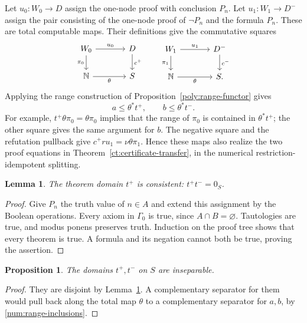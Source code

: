 \documentclass[11pt]{article}
\newtheorem{proposition}[theorem]{Proposition}
\newtheorem{lemma}[theorem]{Lemma}
\theoremstyle{definition}
\theoremstyle{remark}
\newcommand{\N}{\mathbb N}
\begin{document}
Let $u_0:W_0\to D$ assign the one-node proof with conclusion $P_n$.
Let $u_1:W_1\to D^-$ assign the pair consisting of the one-node proof
of $\neg P_n$ and the formula $P_n$. These are total computable maps.
Their definitions give the commutative squares
\begin{equation}\label{num:certificate-maps}
\begin{tikzcd}[column sep=large]
 W_0 \arrow[r,"u_0"] \arrow[d,"\pi_0"'] & D \arrow[d,"c^+"]\\
 \N \arrow[r,"\theta"'] & S
\end{tikzcd}
\qquad
\begin{tikzcd}[column sep=large]
 W_1 \arrow[r,"u_1"] \arrow[d,"\pi_1"'] & D^- \arrow[d,"c^-"]\\
 \N \arrow[r,"\theta"'] & S.
\end{tikzcd}
\end{equation}
Applying the range construction of Proposition~\ref{poly:range-functor}
gives
\begin{equation}\label{num:range-inclusions}
 a\le\theta^*t^+,\qquad b\le\theta^*t^-.
\end{equation}
For example, $t^+\theta\pi_0=\theta\pi_0$ implies that the range of
$\pi_0$ is contained in $\theta^*t^+$; the other square gives the same
argument for $b$.
The negative square and the refutation pullback give
$c^+r u_1=\nu\theta\pi_1$. Hence these maps also realize the two
proof equations in Theorem~\ref{ct:certificate-transfer}, in the
numerical restriction-idempotent splitting.

\begin{lemma}\label{num:consistent}
The theorem domain $t^+$ is consistent: $t^+t^-=0_S$.
\end{lemma}
\begin{proof}
Give $P_n$ the truth value of $n\in A$ and extend this assignment by
the Boolean operations. Every axiom in $\Gamma_0$ is true, since
$A\cap B=\varnothing$. Tautologies are true, and modus ponens preserves
truth. Induction on the proof tree shows that every theorem is true.
A formula and its negation cannot both be true, proving the assertion.
\end{proof}

\begin{proposition}\label{num:proof-inseparable}
The domains $t^+,t^-$ on $S$ are inseparable.
\end{proposition}
\begin{proof}
They are disjoint by Lemma~\ref{num:consistent}. A complementary
separator for them would pull back along the total map $\theta$ to a
complementary separator for $a,b$, by \eqref{num:range-inclusions}.
\end{proof}
\end{document}
